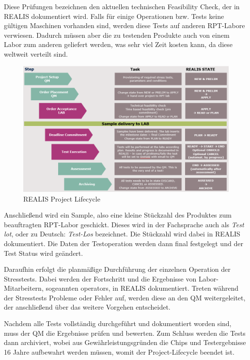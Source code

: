 Diese Prüfungen bezeichnen den aktuellen technischen Feasibility Check, der in \gls{REALIS} dokumentiert wird.
Falls für einige Operationen bzw. Tests keine gültigen Maschinen vorhanden sind, werden diese Tests auf anderen \gls{RPT}-Labore verwiesen. Dadurch müssen aber die zu testenden Produkte auch von einem Labor zum anderen geliefert werden, was sehr viel Zeit kosten kann, da diese weltweit verteilt sind.

\begin{figure}[!h]
    \centering
    \includegraphics[width=1\textwidth]{bilder/realis-project-lifecycle.png}
    \caption{REALIS Project Lifecycle \cite{REALISWikiIntern}}
    \label{fig:realis-project-lifecycle}
\end{figure}

Anschließend wird ein Sample, also eine kleine Stückzahl des Produktes zum beauftragten \gls{RPT}-Labor geschickt. Dieses wird in der Fachsprache auch als \textit{Test \gls{lot}}, oder zu Deutsch: \textit{Test-Los} 
bezeichnet. Die Stückzahl wird dabei in \gls{REALIS} dokumentiert. Die  Daten der Testoperation werden dann final festgelegt und der Test Status wird geändert.

Daraufhin erfolgt die planmäßige Durchführung der einzelnen Operation der Stresstests. Dabei werden der Fortschritt und die Ergebnisse von Labor-Mitarbeitern, sogeannten \glspl{operator}, in \gls{REALIS} dokumentiert. Treten während der Stresstests Probleme oder Fehler auf, werden diese an den \gls{QM} weitergeleitet, der anschließend über das weitere Vorgehen entscheidet.

Nachdem alle Tests vollständig durchgeführt und dokumentiert worden sind, muss der \gls{QM} die Ergebnisse prüfen und bewerten. Zum Schluss werden die Tests dann archiviert, wobei aus Gewährleistungsgründen die Chips und Testergebnisse 16 Jahre aufbewahrt werden müssen, womit der Project-Lifecycle beendet ist.

